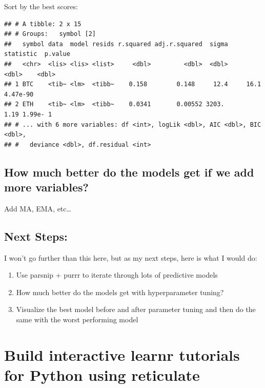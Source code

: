\documentclass[
]{book}
\newenvironment{Shaded}{\begin{snugshade}}{\end{snugshade}}
\newcommand{\KeywordTok}[1]{\textcolor[rgb]{0.13,0.29,0.53}{\textbf{#1}}}
\newcommand{\NormalTok}[1]{#1}
\newcommand{\OperatorTok}[1]{\textcolor[rgb]{0.81,0.36,0.00}{\textbf{#1}}}
\newcommand{\StringTok}[1]{\textcolor[rgb]{0.31,0.60,0.02}{#1}}
\begin{document}
Sort by the best scores:

\begin{Shaded}
\end{Shaded}

\begin{verbatim}
## # A tibble: 2 x 15
## # Groups:   symbol [2]
##   symbol data  model resids r.squared adj.r.squared  sigma statistic  p.value
##   <chr>  <lis> <lis> <list>     <dbl>         <dbl>  <dbl>     <dbl>    <dbl>
## 1 BTC    <tib~ <lm>  <tibb~    0.158        0.148     12.4     16.1  4.47e-90
## 2 ETH    <tib~ <lm>  <tibb~    0.0341       0.00552 3203.       1.19 1.99e- 1
## # ... with 6 more variables: df <int>, logLik <dbl>, AIC <dbl>, BIC <dbl>,
## #   deviance <dbl>, df.residual <int>
\end{verbatim}

\hypertarget{how-much-better-do-the-models-get-if-we-add-more-variables}{%
\subsection{How much better do the models get if we add more variables?}\label{how-much-better-do-the-models-get-if-we-add-more-variables}}

Add MA, EMA, etc\ldots{}

\hypertarget{next-steps}{%
\subsection{Next Steps:}\label{next-steps}}

I won't go further than this here, but as my next steps, here is what I would do:

\begin{enumerate}
\def\labelenumi{\arabic{enumi}.}
\item
  Use parsnip + purrr to iterate through lots of predictive models
\item
  How much better do the models get with hyperparameter tuning?
\item
  Visualize the best model before and after parameter tuning and then do the same with the worst performing model
\end{enumerate}

\hypertarget{build-interactive-learnr-tutorials-for-python-using-reticulate}{%
\section{Build interactive learnr tutorials for Python using reticulate}\label{build-interactive-learnr-tutorials-for-python-using-reticulate}}
\end{document}
